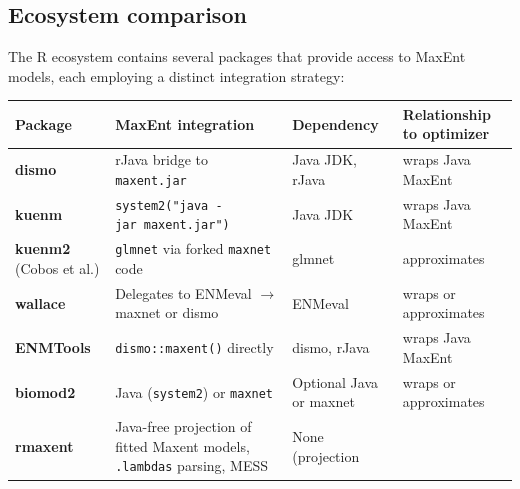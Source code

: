 \documentclass[10pt,letterpaper]{article}
\newcounter{none} %
\begin{document}
\subsection*{Ecosystem comparison}

The R ecosystem contains several packages that provide access to MaxEnt
models, each employing a distinct integration strategy:

{\def\LTcaptype{none} %
\begin{longtable}[]{@{}
  >{\raggedright\arraybackslash}p{}
  >{\raggedright\arraybackslash}p{}
  >{\raggedright\arraybackslash}p{}
  >{\raggedright\arraybackslash}p{}@{}}
\toprule\noalign{}
\begin{minipage}[b]{\linewidth}\raggedright
Package
\end{minipage} & \begin{minipage}[b]{\linewidth}\raggedright
MaxEnt integration
\end{minipage} & \begin{minipage}[b]{\linewidth}\raggedright
Dependency
\end{minipage} & \begin{minipage}[b]{\linewidth}\raggedright
Relationship to optimizer
\end{minipage} \\
\midrule\noalign{}
\endhead
\bottomrule\noalign{}
\endlastfoot
\textbf{dismo} \cite{Hijmans2023} & rJava bridge to \texttt{maxent.jar}
& Java JDK, rJava & wraps Java MaxEnt \\
\textbf{kuenm} \cite{Cobos2019} &
\texttt{system2("java\ -jar\ maxent.jar")} & Java JDK & wraps Java
MaxEnt \\
\textbf{kuenm2} (Cobos et al.) & \texttt{glmnet} via forked
\texttt{maxnet} code & glmnet & approximates \\
\textbf{wallace} \cite{Kass2018wallace} & Delegates to ENMeval \(\to\)
maxnet or dismo & ENMeval & wraps or approximates \\
\textbf{ENMTools} \cite{Warren2010} & \texttt{dismo::maxent()} directly
& dismo, rJava & wraps Java MaxEnt \\
\textbf{biomod2} \cite{Thuiller2009} & Java (\texttt{system2}) or
\texttt{maxnet} & Optional Java or maxnet & wraps or approximates \\
\textbf{rmaxent} \cite{Baumgartner2017} & Java-free projection of
fitted Maxent models, \texttt{.lambdas} parsing, MESS & None (projection

\end{longtable}}
\end{document}
